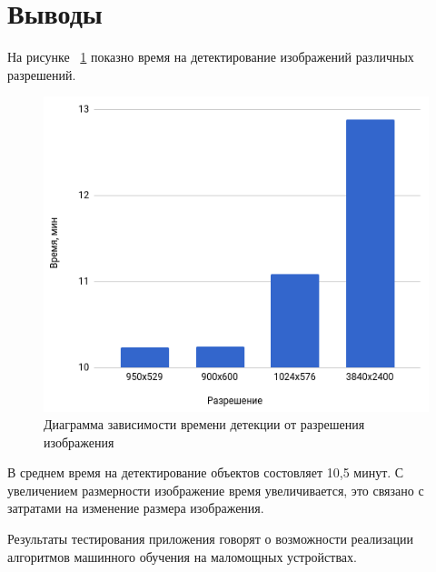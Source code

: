 \documentclass[a4paper,english,russian]{G2-105}
\begin{document}
\section{Выводы} \ttl
\par На рисунке ~\ref{timedetection} показно время на детектирование изображений различных разрешений.
\begin{figure}
	\begin{center}
    		\includegraphics[width=0.6\linewidth]{timedetection.png}
    		\caption{Диаграмма зависимости времени детекции от разрешения изображения}
		\label{timedetection}
	\end{center}
\end{figure}
\par В среднем время на детектирование объектов состовляет 10,5 минут. С увеличением размерности изображение время увеличивается, это связано с затратами на изменение размера изображения.
\par Результаты тестирования приложения говорят о возможности реализации алгоритмов машинного обучения на маломощных устройствах.
\end{document}

